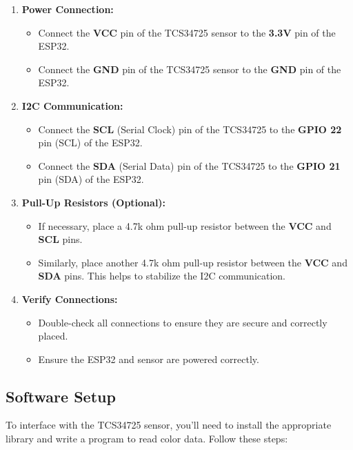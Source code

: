 \begin{enumerate}[label=\arabic*.]
	\item \textbf{Power Connection:}
	\begin{itemize}
		\item Connect the \textbf{VCC} pin of the TCS34725 sensor to the \textbf{3.3V} pin of the ESP32.
		\item Connect the \textbf{GND} pin of the TCS34725 sensor to the \textbf{GND} pin of the ESP32.
	\end{itemize}
	
	\item \textbf{I2C Communication:}
	\begin{itemize}
		\item Connect the \textbf{SCL} (Serial Clock) pin of the TCS34725 to the \textbf{GPIO 22} pin (SCL) of the ESP32.
		\item Connect the \textbf{SDA} (Serial Data) pin of the TCS34725 to the \textbf{GPIO 21} pin (SDA) of the ESP32.
	\end{itemize}
	
	\item \textbf{Pull-Up Resistors (Optional):}
	\begin{itemize}
		\item If necessary, place a 4.7k ohm pull-up resistor between the \textbf{VCC} and \textbf{SCL} pins.
		\item Similarly, place another 4.7k ohm pull-up resistor between the \textbf{VCC} and \textbf{SDA} pins. This helps to stabilize the I2C communication.
	\end{itemize}
	
	\item \textbf{Verify Connections:}
	\begin{itemize}
		\item Double-check all connections to ensure they are secure and correctly placed.
		\item Ensure the ESP32 and sensor are powered correctly.
	\end{itemize}
\end{enumerate}

\subsection*{Software Setup}

To interface with the TCS34725 sensor, you'll need to install the appropriate library and write a program to read color data. Follow these steps:

